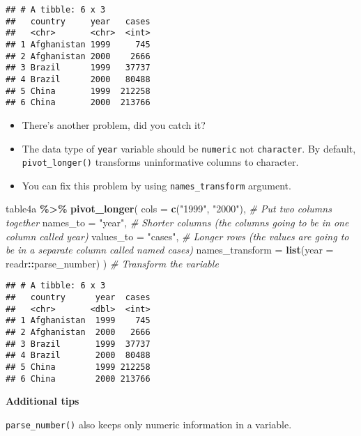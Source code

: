 \documentclass[
]{book}
\newenvironment{Shaded}{\begin{snugshade}}{\end{snugshade}}
\newcommand{\CommentTok}[1]{\textcolor[rgb]{0.56,0.35,0.01}{\textit{#1}}}
\newcommand{\DataTypeTok}[1]{\textcolor[rgb]{0.13,0.29,0.53}{#1}}
\newcommand{\KeywordTok}[1]{\textcolor[rgb]{0.13,0.29,0.53}{\textbf{#1}}}
\newcommand{\NormalTok}[1]{#1}
\newcommand{\OperatorTok}[1]{\textcolor[rgb]{0.81,0.36,0.00}{\textbf{#1}}}
\newcommand{\StringTok}[1]{\textcolor[rgb]{0.31,0.60,0.02}{#1}}
\begin{document}
\begin{verbatim}
## # A tibble: 6 x 3
##   country     year   cases
##   <chr>       <chr>  <int>
## 1 Afghanistan 1999     745
## 2 Afghanistan 2000    2666
## 3 Brazil      1999   37737
## 4 Brazil      2000   80488
## 5 China       1999  212258
## 6 China       2000  213766
\end{verbatim}

\begin{itemize}
\item
  There's another problem, did you catch it?
\item
  The data type of \texttt{year} variable should be \texttt{numeric} not \texttt{character}. By default, \texttt{pivot\_longer()} transforms uninformative columns to character.
\item
  You can fix this problem by using \texttt{names\_transform} argument.
\end{itemize}

\begin{Shaded}
\begin{Highlighting}[]
\NormalTok{table4a }\OperatorTok{\%\textgreater{}\%}
\StringTok{  }\KeywordTok{pivot\_longer}\NormalTok{(}
    \DataTypeTok{cols =} \KeywordTok{c}\NormalTok{(}\StringTok{"1999"}\NormalTok{, }\StringTok{"2000"}\NormalTok{), }\CommentTok{\# Put two columns together}
    \DataTypeTok{names\_to =} \StringTok{"year"}\NormalTok{, }\CommentTok{\# Shorter columns (the columns going to be in one column called year)}
    \DataTypeTok{values\_to =} \StringTok{"cases"}\NormalTok{, }\CommentTok{\# Longer rows (the values are going to be in a separate column called named cases)}
    \DataTypeTok{names\_transform =} \KeywordTok{list}\NormalTok{(}\DataTypeTok{year =}\NormalTok{ readr}\OperatorTok{::}\NormalTok{parse\_number)}
\NormalTok{  ) }\CommentTok{\# Transform the variable}
\end{Highlighting}
\end{Shaded}

\begin{verbatim}
## # A tibble: 6 x 3
##   country      year  cases
##   <chr>       <dbl>  <int>
## 1 Afghanistan  1999    745
## 2 Afghanistan  2000   2666
## 3 Brazil       1999  37737
## 4 Brazil       2000  80488
## 5 China        1999 212258
## 6 China        2000 213766
\end{verbatim}

\textbf{Additional tips}

\texttt{parse\_number()} also keeps only numeric information in a variable.
\end{document}
